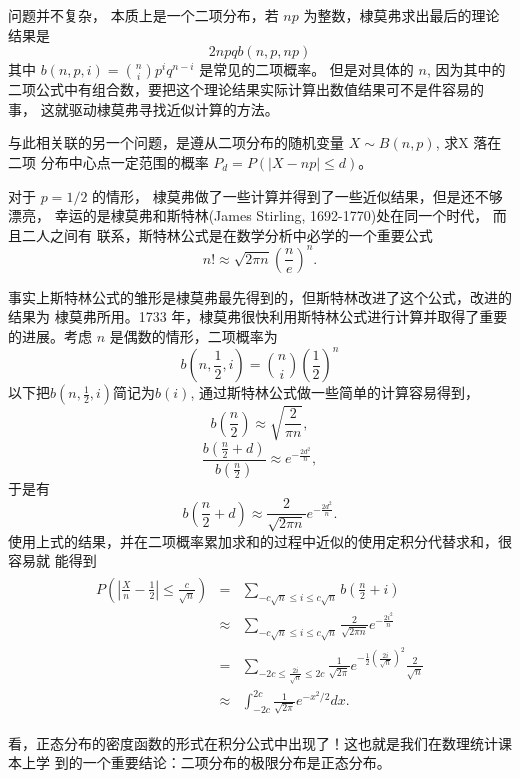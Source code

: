 问题并不复杂， 本质上是一个二项分布，若 $np$ 为整数，棣莫弗求出最后的理论结果是
$$ 2npq b(n, p, np)$$
其中 $ b(n,p,i) = \binom{n}{i}p^iq^{n-i}$ 是常见的二项概率。 但是对具体的 $n$,
因为其中的二项公式中有组合数，要把这个理论结果实际计算出数值结果可不是件容易的
事， 这就驱动棣莫弗寻找近似计算的方法。

与此相关联的另一个问题，是遵从二项分布的随机变量 $ X \sim B(n,p)$, 求X 落在二项
分布中心点一定范围的概率 $ P_d = P(|X - np| \le d)$。

对于 $p=1/2$ 的情形， 棣莫弗做了一些计算并得到了一些近似结果，但是还不够漂亮，
幸运的是棣莫弗和斯特林(James Stirling, 1692-1770)处在同一个时代， 而且二人之间有
联系，斯特林公式是在数学分析中必学的一个重要公式
$$ \displaystyle n! \approx \sqrt{2\pi n} \left(\frac{n}{e}\right)^n .$$

事实上斯特林公式的雏形是棣莫弗最先得到的，但斯特林改进了这个公式，改进的结果为
棣莫弗所用。1733 年，棣莫弗很快利用斯特林公式进行计算并取得了重要的进展。考虑
$n$ 是偶数的情形，二项概率为
$$b(n, \frac{1}{2}, i) = \binom{n}{i}\left(\frac{1}{2}\right)^n$$
以下把$b(n, \frac{1}{2}, i)$简记为$b(i)$, 通过斯特林公式做一些简单的计算容易得到，
$$ \displaystyle b\left(\frac{n}{2}\right) \approx \sqrt{\frac{2}{\pi n}}, $$
$$ \displaystyle \frac{b\left(\frac{n}{2}+d\right)}{b\left(\frac{n}{2}\right)} \approx e^{-\frac{2d^2}{n}}, $$
于是有
$$ \displaystyle b\left(\frac{n}{2}+d\right) \approx \frac{2}{\sqrt{2 \pi n}}e^{-\frac{2d^2}{n}}. $$
使用上式的结果，并在二项概率累加求和的过程中近似的使用定积分代替求和，很容易就
能得到
\begin{eqnarray}
\begin{array}{lll}
\displaystyle P\left(\left|\frac{X}{n} - \frac{1}{2}\right| \le \frac{c}{\sqrt{n}}\right)
& = & \displaystyle \sum_{-c\sqrt{n} \le i \le c\sqrt{n}}b\left(\frac{n}{2}+i\right) \\
& \approx & \displaystyle \sum_{-c\sqrt{n} \le i \le c\sqrt{n}} \frac{2}{\sqrt{2 \pi n}}e^{-\frac{2i^2}{n}}  \\
& = & \displaystyle \sum_{-2c \le \frac{2i}{\sqrt{n}} \le 2c}
\frac{1}{\sqrt{2 \pi}}e^{-\frac{1}{2}(\frac{2i}{\sqrt{n}})^2} \frac{2}{\sqrt{n}} \\
& \approx &\displaystyle  \int_{-2c}^{2c} \frac{1}{\sqrt{2\pi}} e^{-x^2/2} dx .
\end{array}
\end{eqnarray}

看，正态分布的密度函数的形式在积分公式中出现了！这也就是我们在数理统计课本上学
到的一个重要结论：二项分布的极限分布是正态分布。

